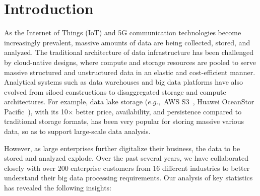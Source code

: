 \section{Introduction} 
\label{sec:intro}


As the Internet of Things (IoT) and 5G communication technologies become increasingly prevalent, massive amounts of data are being collected, stored, and analyzed.
 The traditional architecture of data infrastructure  has been challenged by cloud-native designs, where compute and storage resources are pooled to serve massive structured and unstructured data in an elastic and cost-efficient manner.
  Analytical systems such as data warehouses and big data platforms have also evolved from siloed constructions to disaggregated storage and compute architectures. For example, data lake storage ($e.g.,$ AWS S3~\cite{}, Huawei OceanStor Pacific~\cite{}), with its 10$\times$ better price, availability, and persistence compared to traditional storage formats, has been very popular for storing massive various data, so as to support large-scale data analysis.


However, as large enterprises further digitalize their business, the data to be stored and analyzed explode. Over the past several years, we have collaborated closely with over 200 enterprise customers from 16 different industries to better understand their big data processing requirements. Our analysis of key statistics has revealed the following insights:

